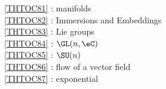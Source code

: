 \ref {THTOC81} : manifolds\\
\ref {THTOC82} : Immersions and Embeddings\\
\ref {THTOC83} : Lie groups\\
\ref {THTOC84} : \( \GL (n,\eC )\)\\
\ref {THTOC85} : \( \SU (n)\)\\
\ref {THTOC86} : flow of a vector field\\
\ref {THTOC87} : exponential\\
